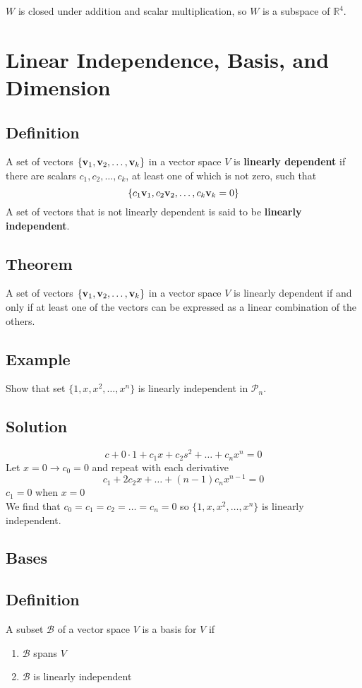 $W$ is closed under addition and scalar multiplication, so $W$ is a subspace of $\mathbb{R}^4$.

\section{Linear Independence, Basis, and Dimension}

\subsection*{Definition}
A set of vectors $\{\mathbf{v}_1, \mathbf{v}_2,\dots, \mathbf{v}_k\}$ in a vector space $V$ is
\textbf{linearly dependent} if there are scalars $c_1, c_2,\dots, c_k$, at
least one of which is not zero, such that
\[\{c_1\mathbf{v}_1, c_2\mathbf{v}_2,\dots, c_k\mathbf{v}_k=0\}\]
A set of vectors that is not linearly dependent is said to be \textbf{linearly independent}.

\subsection*{Theorem}
A set of vectors $\{\mathbf{v}_1, \mathbf{v}_2,\dots, \mathbf{v}_k\}$ in a vector space $V$ is linearly
dependent if and only if at least one of the vectors can be expressed as a linear combination
of the others.

\subsection*{Example}
Show that set $\{1, x, x^2,\dots, x^n\}$ is linearly independent in $\mathscr{P}_n$.

\subsection*{Solution}
\[c+0\cdot1+c_1x+c_2s^2+\dots+c_nx^n=0\]
Let $x=0\to c_0=0$ and repeat with each derivative
\[c_1+2c_2x+\dots+(n-1)c_nx^{n-1}=0\]
$c_1=0$ when $x=0$ \\
We find that $c_0=c_1=c_2=\dots=c_n=0$ so $\{1, x, x^2,\dots, x^n\}$ is linearly independent.

\subsection*{Bases}

\subsection*{Definition}
A subset $\mathcal{B}$ of a vector space $V$ is a basis for $V$ if
\begin{enumerate}
    \item $\mathcal{B}$ spans $V$
    \item $\mathcal{B}$ is linearly independent
\end{enumerate}

